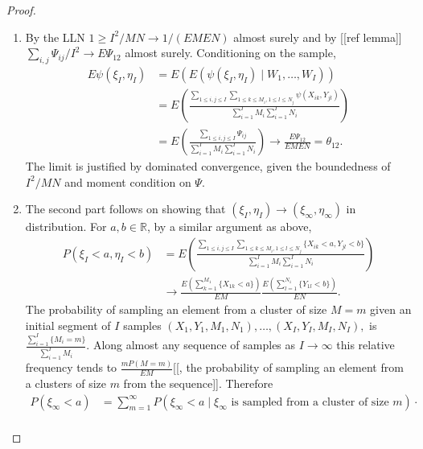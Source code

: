 \message{ !name(manuscript.tex)}\documentclass[12pt]{article}
\DeclareMathOperator{\AUC}{AUC}
\newcommand{\I}{I}
\newcommand{\E}{E}
\renewcommand{\P}{P}
\newcommand{\cind}{\perp \!\!\! \perp}
\newcommand{\aucpop}{\theta_{12}}%
\newcommand{\kernel}{\psi}
\newcommand{\Kernel}{\Psi}
\begin{document}
  \begin{proof}
    \begin{enumerate}
    \item By the LLN $1 \ge \I^2/MN \to 1/(\E M\E N)$ almost surely and by [[ref lemma]] $\sum_{i,j}\Kernel_{ij}/\I^2 \to \E \Kernel_{12}$ almost surely. Conditioning on the sample, 
      \begin{align}
        \E \kernel(\xi_\I,\eta_\I) &= \E( \E (\kernel(\xi_\I,\eta_\I) \mid W_1,\ldots,W_\I))\\
                                   &= \E\left(\frac
                                     {\sum_{1\le i,j\le\I}\sum_{1\le k\le M_i,1\le l\le N_j}\kernel(X_{ik},Y_{jl})}
                                     {\sum_{i=1}^\I M_i \sum_{i=1}^\I N_i} \right)\\
                                   &= \E\left(\frac{\sum_{1\le i,j\le\I}\Kernel_{ij}}{\sum_{i=1}^\I M_i \sum_{i=1}^\I N_i} \right) \to \frac{\E\Kernel_{12}}{\E M \E N}=\aucpop.
      \end{align}
      The limit is justified by dominated convergence, given the boundedness of $\I^2/MN$ and moment condition on $\Kernel$.
    \item The second part follows on showing that $(\xi_\I,\eta_\I)\to (\xi_\infty,\eta_\infty)$ in distribution. For $a,b\in\mathbb{R}$, by a similar argument as above,
      \begin{align}
        \P(\xi_\I<a,\eta_\I<b) &=\E\left(\frac
                                     {\sum_{1\le i,j\le\I}\sum_{1\le k\le M_i,1\le l\le N_j}\{X_{ik}<a,Y_{jl}<b\}}
                                 {\sum_{i=1}^\I M_i \sum_{i=1}^\I N_i} \right)\\
                               &\to \frac{\E\left(\sum_{k=1}^{M_1}\{X_{1k}<a\}\right)}{\E M}
                                 \frac{\E\left(\sum_{l=1}^{N_1}\{Y_{1l}<b\}\right)}{\E N}.                         
      \end{align}
      The probability of sampling an element from a cluster of size
      $M=m$ given an initial segment of $\I$ samples
      $(X_1,Y_1,M_1,N_1),\ldots,(X_\I,Y_\I,M_\I,N_\I),$ is
      $\frac{\sum_{i=1}^\I\{M_i=m\}}{\sum_{i=1}^\I M_i}$. Along almost
      any sequence of samples as $\I\to\infty$ this relative frequency
      tends to $\frac{m\P(M=m)}{\E M}$[[, the probability of sampling an
      element from a clusters of size $m$ from the sequence]]. Therefore
      \begin{align}
        \P(\xi_\infty < a) &= \sum_{m=1}^\infty\P(\xi_\infty < a \mid \xi_\infty\text{ is sampled from a cluster of size }m)\cdot\\

\end{align}
\end{enumerate}
\end{proof}
\end{document}
